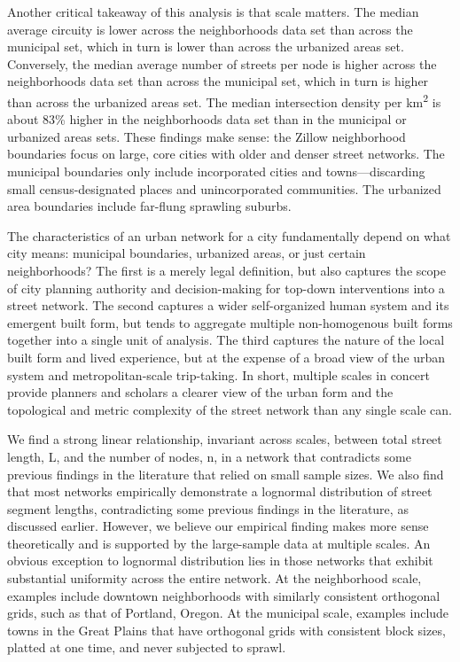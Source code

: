 \documentclass{article}
\begin{document}
Another critical takeaway of this analysis is that scale matters. The median average circuity is lower across the neighborhoods data set than across the municipal set, which in turn is lower than across the urbanized areas set. Conversely, the median average number of streets per node is higher across the neighborhoods data set than across the municipal set, which in turn is higher than across the urbanized areas set. The median intersection density per km\textsuperscript{2} is about 83\% higher in the neighborhoods data set than in the municipal or urbanized areas sets. These findings make sense: the Zillow neighborhood boundaries focus on large, core cities with older and denser street networks. The municipal boundaries only include incorporated cities and towns---discarding small census-designated places and unincorporated communities. The urbanized area boundaries include far-flung sprawling suburbs.

The characteristics of an urban network for a city fundamentally depend on what city means: municipal boundaries, urbanized areas, or just certain neighborhoods? The first is a merely legal definition, but also captures the scope of city planning authority and decision-making for top-down interventions into a street network. The second captures a wider self-organized human system and its emergent built form, but tends to aggregate multiple non-homogenous built forms together into a single unit of analysis. The third captures the nature of the local built form and lived experience, but at the expense of a broad view of the urban system and metropolitan-scale trip-taking. In short, multiple scales in concert provide planners and scholars a clearer view of the urban form and the topological and metric complexity of the street network than any single scale can.

We find a strong linear relationship, invariant across scales, between total street length, L, and the number of nodes, n, in a network that contradicts some previous findings in the literature that relied on small sample sizes. We also find that most networks empirically demonstrate a lognormal distribution of street segment lengths, contradicting some previous findings in the literature, as discussed earlier. However, we believe our empirical finding makes more sense theoretically and is supported by the large-sample data at multiple scales. An obvious exception to lognormal distribution lies in those networks that exhibit substantial uniformity across the entire network. At the neighborhood scale, examples include downtown neighborhoods with similarly consistent orthogonal grids, such as that of Portland, Oregon. At the municipal scale, examples include towns in the Great Plains that have orthogonal grids with consistent block sizes, platted at one time, and never subjected to sprawl. 
\end{document}
